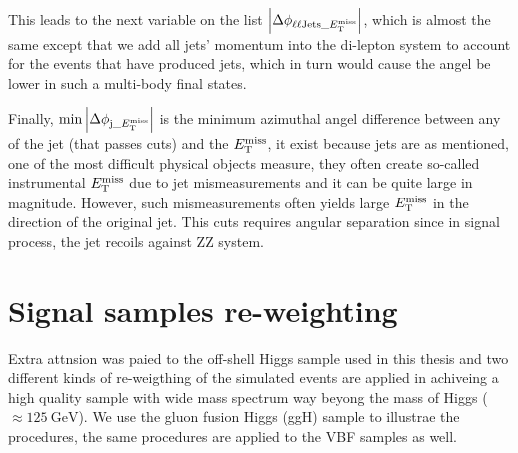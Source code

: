 This leads to the next variable on the list $\abs{\Delta\phi_{\ell\ell\mathrm{Jets}\_E_{\mathrm{T}}^{\mathrm{miss}}}}$, which
is almost the same except that we add all jets' momentum into the di-lepton system to account
for the events that have produced jets, which in turn would cause the angel be lower in such
a multi-body final states.

Finally, $\min{\abs{ \Delta\phi_{\mathrm{j}\_E_{\mathrm{T}}^{\mathrm{miss}}}}}$ is the minimum azimuthal angel difference between
any of the jet (that passes cuts) and the $E_{\mathrm{T}}^{\mathrm{miss}}$, it exist because jets are as mentioned, one of the 
most difficult physical objects measure, they often create so-called instrumental $E_{\mathrm{T}}^{\mathrm{miss}}$ due to jet
mismeasurements and it can be quite large in magnitude. However, such mismeasurements often yields large
$E_{\mathrm{T}}^{\mathrm{miss}}$ in the direction of the original jet. This cuts requires angular separation since in signal process,
the jet recoils against ZZ system.
\newpage\phantom{blabla}

\section{Signal samples re-weighting}
\label{sec:sig_rewgt}
Extra attnsion was paied to the off-shell Higgs sample used in this thesis and two different kinds
of re-weigthing of the simulated events are applied in achiveing a high quality sample with wide
mass spectrum way beyong the mass of Higgs ($\approx \SI{125}{\giga\electronvolt}$). We use the
gluon fusion Higgs (ggH) sample to illustrae the procedures, the same procedures are applied to
the VBF samples as well.

